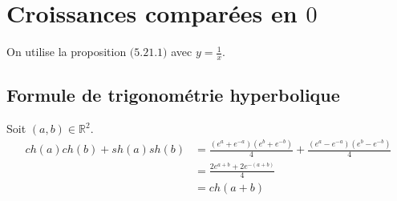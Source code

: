 \documentclass[../main.tex]{subfiles}
\begin{document}
\section{Croissances comparées en $0$}
On utilise la proposition $\text{(5.21.1)}$ avec $y = \frac{1}{x}$. 

\setcounter{section}{43}
\setcounter{subsection}{1}
\subsection{Formule de trigonométrie hyperbolique}
Soit $(a, b) \in \mathbb{R}^2$. 
\begin{align*}
    ch(a)ch(b) + sh(a)sh(b) &= \frac{(e^a + e^{-a})(e^b + e^{-b})}{4} + \frac{(e^a - e^{-a})(e^b - e^{-b})}{4} \\
    &= \frac{2e^{a + b} + 2e^{-(a + b)}}{4} \\
    &= ch(a + b)
\end{align*}
\end{document}
